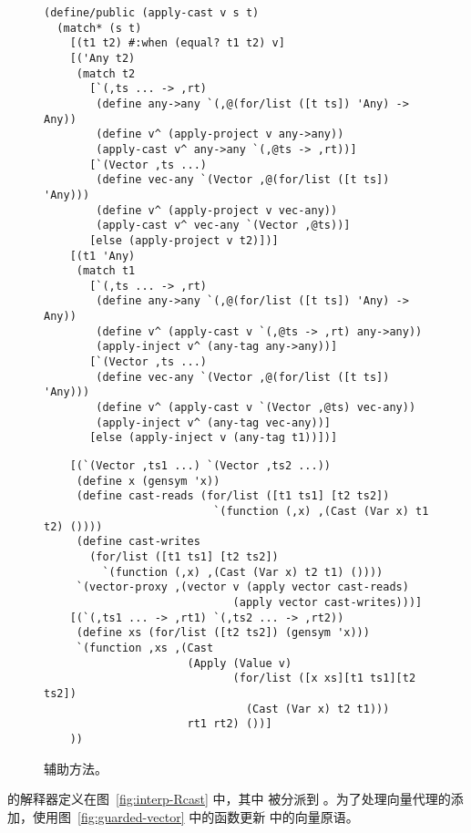 \documentclass[11pt]{book}
\begin{document}
\begin{figure}[tbp]
\begin{lstlisting}
(define/public (apply-cast v s t)
  (match* (s t)
    [(t1 t2) #:when (equal? t1 t2) v]
    [('Any t2) 
     (match t2
       [`(,ts ... -> ,rt)
        (define any->any `(,@(for/list ([t ts]) 'Any) -> Any))
        (define v^ (apply-project v any->any))
        (apply-cast v^ any->any `(,@ts -> ,rt))]
       [`(Vector ,ts ...)
        (define vec-any `(Vector ,@(for/list ([t ts]) 'Any)))
        (define v^ (apply-project v vec-any))
        (apply-cast v^ vec-any `(Vector ,@ts))]
       [else (apply-project v t2)])]
    [(t1 'Any) 
     (match t1
       [`(,ts ... -> ,rt)
        (define any->any `(,@(for/list ([t ts]) 'Any) -> Any))
        (define v^ (apply-cast v `(,@ts -> ,rt) any->any))
        (apply-inject v^ (any-tag any->any))]
       [`(Vector ,ts ...)
        (define vec-any `(Vector ,@(for/list ([t ts]) 'Any)))
        (define v^ (apply-cast v `(Vector ,@ts) vec-any))
        (apply-inject v^ (any-tag vec-any))]
       [else (apply-inject v (any-tag t1))])]
\end{lstlisting}
\end{figure}
\begin{figure}[tbp]
\begin{lstlisting}       
    [(`(Vector ,ts1 ...) `(Vector ,ts2 ...))
     (define x (gensym 'x))
     (define cast-reads (for/list ([t1 ts1] [t2 ts2])
                          `(function (,x) ,(Cast (Var x) t1 t2) ())))
     (define cast-writes
       (for/list ([t1 ts1] [t2 ts2])
         `(function (,x) ,(Cast (Var x) t2 t1) ())))
     `(vector-proxy ,(vector v (apply vector cast-reads)
                             (apply vector cast-writes)))]
    [(`(,ts1 ... -> ,rt1) `(,ts2 ... -> ,rt2))
     (define xs (for/list ([t2 ts2]) (gensym 'x)))
     `(function ,xs ,(Cast
                      (Apply (Value v)
                             (for/list ([x xs][t1 ts1][t2 ts2])
                               (Cast (Var x) t2 t1)))
                      rt1 rt2) ())]
    ))
\end{lstlisting}
\caption{  辅助方法。}
  \label{fig:apply-cast}
\end{figure}

 \LangCast{} 的解释器定义在图~\ref{fig:interp-Rcast} 中，其中 
被分派到  。为了处理向量代理的添加，使用图~\ref{fig:guarded-vector} 中的函数更新  中的向量原语。
\end{document}
